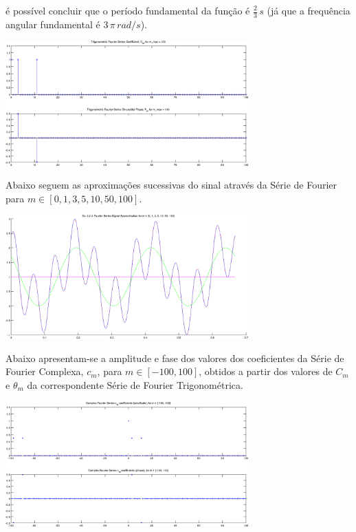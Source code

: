\documentclass[a4paper]{article}
\begin{document}
\noindent é possível concluir que o período fundamental da função é $\frac{2}{3} \, s$ (já que a frequência angular fundamental é $3 \, \pi \, rad/s$).

\begin{center}
	\includegraphics[width=0.70\textwidth]{images/ex2_2_3_cm_tm.png}
	\label{fig:ex2_2_3_cm_tm}
\end{center}

\noindent Abaixo seguem as aproximações sucessivas do sinal através da Série de Fourier para $m \in [0, 1, 3, 5, 10, 50, 100]$.
\begin{center}
	\includegraphics[width=0.70\textwidth]{images/ex2_2_3_approx.png}
	\label{fig:ex2_2_3_approx}
\end{center}

\noindent Abaixo apresentam-se a amplitude e fase dos valores dos coeficientes da Série de Fourier Complexa, $c_m$, para $m \in [-100, 100]$, obtidos a partir dos valores de $C_m$ e $\theta_m$ da correspondente Série de Fourier Trigonométrica.
\begin{center}
	\includegraphics[width=0.70\textwidth]{images/ex2_2_3_complex_cm.png}
	\label{fig:ex2_2_3_complex_cm}
\end{center}
\end{document}
